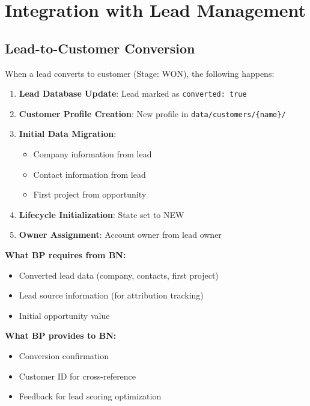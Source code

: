 \section{Integration with Lead Management}
\label{sec:bp-integration}

\subsection{Lead-to-Customer Conversion}

When a lead converts to customer (Stage: WON), the following happens:

\begin{enumerate}
\item \textbf{Lead Database Update}: Lead marked as \texttt{converted: true}
\item \textbf{Customer Profile Creation}: New profile in \texttt{data/customers/\{name\}/}
\item \textbf{Initial Data Migration}:
    \begin{itemize}
    \item Company information from lead
    \item Contact information from lead
    \item First project from opportunity
    \end{itemize}
\item \textbf{Lifecycle Initialization}: State set to NEW
\item \textbf{Owner Assignment}: Account owner from lead owner
\end{enumerate}

\begin{tcolorbox}[colback=yellow!5!white, colframe=yellow!75!black,
    title=Integration: Appendix BP $\leftrightarrow$ Appendix BN (Lead Management)]
\textbf{What BP requires from BN:}
\begin{itemize}[nosep]
\item Converted lead data (company, contacts, first project)
\item Lead source information (for attribution tracking)
\item Initial opportunity value
\end{itemize}

\textbf{What BP provides to BN:}
\begin{itemize}[nosep]
\item Conversion confirmation
\item Customer ID for cross-reference
\item Feedback for lead scoring optimization
\end{itemize}
\end{tcolorbox}


